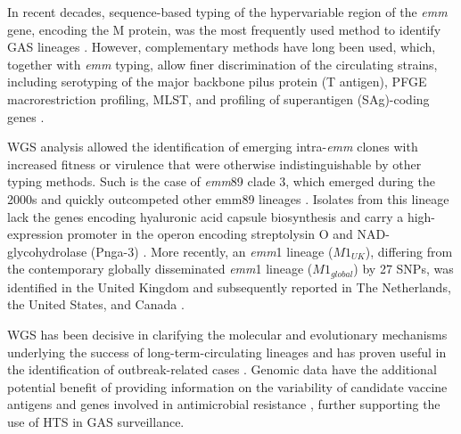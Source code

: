 In recent decades, sequence-based typing of the hypervariable region of the \textit{emm} gene, encoding the M protein, was the most frequently used method to identify \ac{GAS} lineages \cite{beall_sequencing_1996}. However, complementary methods have long been used, which, together with \textit{emm} typing, allow ﬁner discrimination of the circulating strains, including serotyping of the major backbone pilus protein (T antigen), \ac{PFGE} macrorestriction proﬁling, \ac{MLST}, and proﬁling of superantigen (SAg)-coding genes \cite{carrico_illustration_2006, friaes_superantigen_2013, enright_multilocus_2001}.

\ac{WGS} analysis allowed the identiﬁcation of emerging intra-\textit{emm} clones with increased ﬁtness or virulence that were otherwise indistinguishable by other typing methods. Such is the case of \textit{emm}89 clade 3, which emerged during the 2000s and quickly outcompeted other emm89 lineages \cite{friaes_emergence_2015, turner_emergence_2015, zhu_molecular_2015}. Isolates from this lineage lack the genes encoding hyaluronic acid capsule biosynthesis and carry a high-expression promoter in the operon encoding streptolysin O and NAD-glycohydrolase (Pnga-3) \cite{turner_emergence_2015, zhu_trading_2015}. More recently, an \textit{emm}1 lineage ($M1_{UK}$), differing from the contemporary globally disseminated \textit{emm}1 lineage ($M1_{global}$) by 27 \ac{SNPs}, was identiﬁed in the United Kingdom \cite{lynskey_emergence_2019} and subsequently reported in The Netherlands, the United States, and Canada \cite{rumke_dominance_2020, li_m1uk_2020, demczuk_identification_2019}.

\ac{WGS} has been decisive in clarifying the molecular and evolutionary mechanisms underlying the success of long-term-circulating lineages \cite{nasser_evolutionary_2014, beres_molecular_2010} and has proven useful in the identiﬁcation of outbreak-related cases \cite{turner_community_2017, coelho_genomic_2019}. Genomic data have the additional potential beneﬁt of providing information on the variability of candidate vaccine antigens and genes involved in antimicrobial resistance \cite{davies_atlas_2019, beres_integrative_2022}, further supporting the use of \ac{HTS} in \ac{GAS} surveillance.

